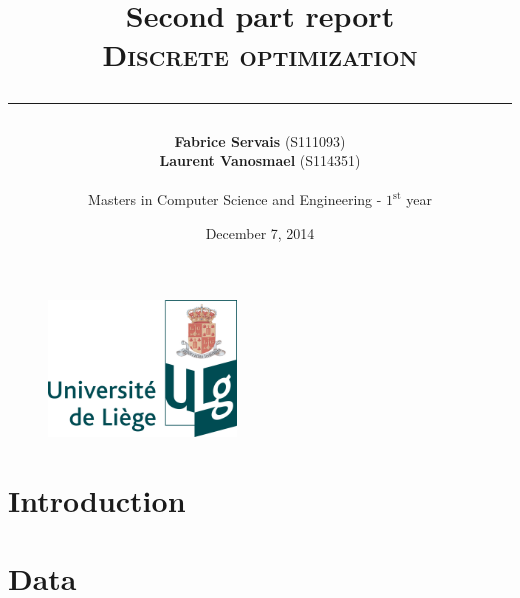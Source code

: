 \documentclass[a4paper,titlepage]{article}
\begin{document}
\begin{titlepage}

\begin{figure}
\centering
\includegraphics[width=5cm]{logo-ulg.png}
\end{figure}



\title{
\vspace{0.2cm}
\LARGE{\textbf{Second part report}} \\ \textsc{Discrete optimization}
\author{\textbf{Fabrice Servais} \small{(S111093})\\\textbf{Laurent Vanosmael} \small{(S114351}) \\ \\ Masters in Computer Science and Engineering - $1^{\text{st}}$ year}
\date{December 7, 2014}
\rule{15cm}{1.5pt}
}

\end{titlepage}

\pagestyle{fancy}

\maketitle

\section{Introduction}



\section{Data}
\end{document}
